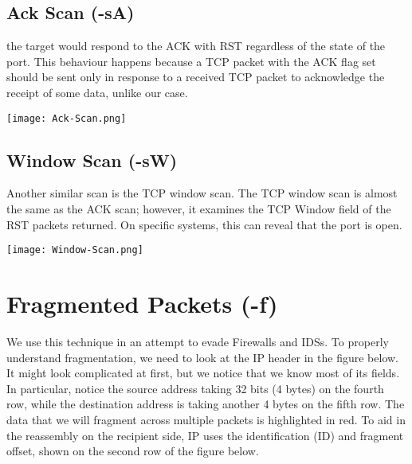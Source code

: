 \documentclass[11pt,a4paper]{article}
\begin{document}
\clearpage

\subsection{Ack Scan (-sA)}
the target would respond to the ACK with RST regardless of the state
of the port. This behaviour happens because a TCP packet with the ACK
flag set should be sent only in response to a received TCP packet to
acknowledge the receipt of some data, unlike our case.

\begin{center}
  \texttt{[image: Ack-Scan.png]}
  \label{fig:Ack-Scan}
\end{center}

\subsection{Window Scan (-sW)}
Another similar scan is the TCP window scan. The TCP window scan is
almost the same as the ACK scan; however, it examines the TCP Window
field of the RST packets returned. On specific systems, this can
reveal that the port is open.

\begin{center}
  \texttt{[image: Window-Scan.png]}
  \label{fig:Ack-Scan}
\end{center}
\clearpage
\section{Fragmented Packets (-f)}
We use this technique in an attempt to evade Firewalls and IDSs. To properly understand fragmentation, we need to look at the IP header in the figure below. It might look complicated at first, but we notice that we know most of its fields. In particular, notice the source address taking 32 bits (4 bytes) on the fourth row, while the destination address is taking another 4 bytes on the fifth row. The data that we will fragment across multiple packets is highlighted in red. To aid in the reassembly on the recipient side, IP uses the identification (ID) and fragment offset, shown on the second row of the figure below.
\end{document}
